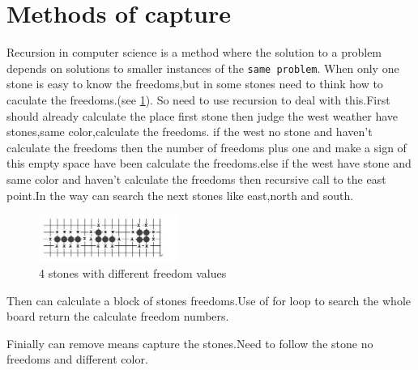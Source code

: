 \documentclass[a4,10pt]{article}
\begin{document}
  \section{Methods of capture}
    Recursion in computer science is a method where the solution to a problem depends on solutions to smaller instances of the \texttt{same problem}.
    When only one stone is easy to know the freedoms,but in some stones need to think how to caculate the freedoms.\cite{Graham:1990}(see \cref{fig:freedoms}).
    So need to use recursion to deal with this.First should already calculate the place first stone then judge the west weather have stones,same color,calculate the freedoms.
    if the west no stone and haven't calculate the freedoms then the number of freedoms plus one and make a sign of this empty
    space have been calculate the freedoms.else if the west have stone and same color and haven't calculate the freedoms then
    recursive call to the east point.In the way can search the next stones like east,north and south.

      \begin{figure}[tbp]
      \centering
     \includegraphics[width=0.40\textwidth]{gfx/freedoms.png}
     \caption{ 4 stones with different freedom values}
     \label{fig:freedoms}
     \end{figure}

    Then can calculate a block of stones freedoms.Use of for loop to search the whole board
    return the calculate freedom numbers.

    Finially can remove means capture the stones.Need to follow the stone no freedoms and different color.




\end{document}
